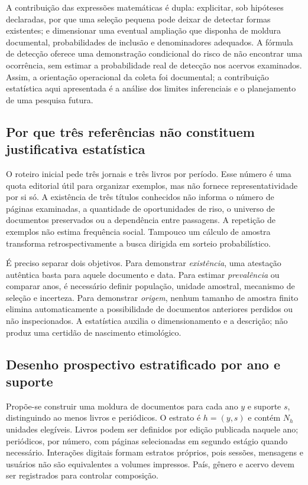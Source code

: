 A contribuição das expressões matemáticas é dupla: explicitar, sob hipóteses declaradas, por que uma seleção pequena pode deixar de detectar formas existentes; e dimensionar uma eventual ampliação que disponha de moldura documental, probabilidades de inclusão e denominadores adequados. A fórmula de detecção oferece uma demonstração condicional do risco de não encontrar uma ocorrência, sem estimar a probabilidade real de detecção nos acervos examinados. Assim, a orientação operacional da coleta foi documental; a contribuição estatística aqui apresentada é a análise dos limites inferenciais e o planejamento de uma pesquisa futura.

\subsection{Por que três referências não constituem justificativa estatística}
O roteiro inicial pede três jornais e três livros por período. Esse número é uma quota editorial útil para organizar exemplos, mas não fornece representatividade por si só. A existência de três títulos conhecidos não informa o número de páginas examinadas, a quantidade de oportunidades de riso, o universo de documentos preservados ou a dependência entre passagens. A repetição de exemplos não estima frequência social. Tampouco um cálculo de amostra transforma retrospectivamente a busca dirigida em sorteio probabilístico.

É preciso separar dois objetivos. Para demonstrar \emph{existência}, uma atestação autêntica basta para aquele documento e data. Para estimar \emph{prevalência} ou comparar anos, é necessário definir população, unidade amostral, mecanismo de seleção e incerteza. Para demonstrar \emph{origem}, nenhum tamanho de amostra finito elimina automaticamente a possibilidade de documentos anteriores perdidos ou não inspecionados. A estatística auxilia o dimensionamento e a descrição; não produz uma certidão de nascimento etimológico.

\subsection{Desenho prospectivo estratificado por ano e suporte}
Propõe-se construir uma moldura de documentos para cada ano $y$ e suporte $s$, distinguindo ao menos livros e periódicos. O estrato é $h=(y,s)$ e contém $N_h$ unidades elegíveis. Livros podem ser definidos por edição publicada naquele ano; periódicos, por número, com páginas selecionadas em segundo estágio quando necessário. Interações digitais formam estratos próprios, pois sessões, mensagens e usuários não são equivalentes a volumes impressos. País, gênero e acervo devem ser registrados para controlar composição.

